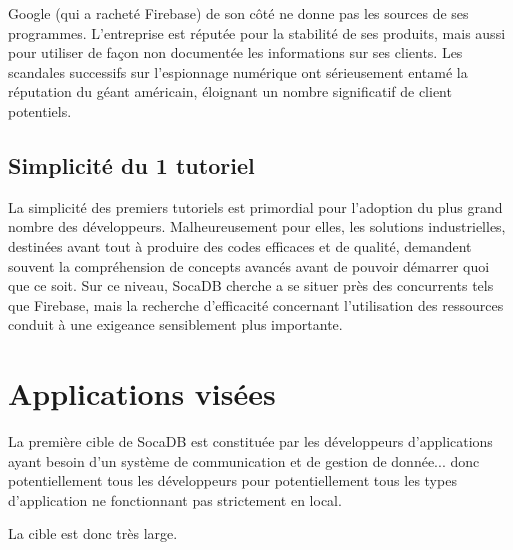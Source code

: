 \documentclass[a4paper,10pt]{scrreprt}
\begin{document}
            Google (qui a racheté Firebase) de son côté ne donne pas les sources de ses programmes. L'entreprise est réputée pour la stabilité de ses produits, mais aussi pour utiliser de façon non documentée les informations sur ses clients. Les scandales successifs sur l'espionnage numérique ont sérieusement entamé la réputation du géant américain, éloignant un nombre significatif de client potentiels.
        
        \subsection{Simplicité du 1 tutoriel}
        
            La simplicité des premiers tutoriels est primordial pour l'adoption du plus grand nombre des développeurs. Malheureusement pour elles, les solutions industrielles, destinées avant tout à produire des codes efficaces et de qualité, demandent souvent la compréhension de concepts avancés avant de pouvoir démarrer quoi que ce soit. Sur ce niveau, SocaDB cherche a se situer près des concurrents tels que Firebase, mais la recherche d'efficacité concernant l'utilisation des ressources conduit à une exigeance sensiblement plus importante.
    
    \section{Applications visées}

        La première cible de SocaDB est constituée par les développeurs d'applications ayant besoin d'un système de communication et de gestion de donnée... donc potentiellement tous les développeurs pour potentiellement tous les types d'application ne fonctionnant pas strictement en local.
        
        La cible est donc très large.
        
        
\end{document}
